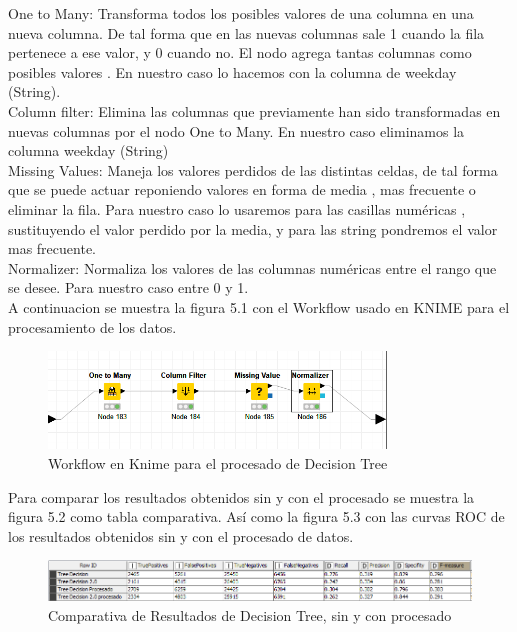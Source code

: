 	One to Many: Transforma todos los posibles valores de una columna en una nueva columna. De tal forma que en las nuevas columnas sale 1 cuando la fila pertenece a ese valor, y 0 cuando no. El nodo agrega tantas columnas como posibles valores . En nuestro caso lo hacemos con la columna de weekday (String). \\
	
	Column filter: Elimina las columnas que previamente han sido transformadas en nuevas columnas por el nodo One to Many. En nuestro caso eliminamos la columna weekday (String) \\
	
	Missing Values: Maneja los valores perdidos de las distintas celdas, de tal forma que se puede actuar reponiendo valores en forma de media , mas frecuente o eliminar la fila. Para nuestro caso lo usaremos para las casillas numéricas , sustituyendo el valor perdido por la media, y para las string pondremos el valor mas frecuente. \\
	
	Normalizer: Normaliza los valores de las columnas numéricas entre el rango que se desee. Para nuestro caso entre 0 y 1.\\
	
	A continuacion se muestra la figura 5.1 con el Workflow usado en KNIME para el procesamiento de los datos. 
	
	\begin{figure}[htb]
		\centering
		\includegraphics[width=0.8\textwidth]{./imagenes/58}
		\caption{Workflow en Knime para el procesado de Decision Tree} \label{fig:1}
	\end{figure}
	
	Para comparar los resultados obtenidos sin y con el procesado se muestra la figura 5.2 como tabla comparativa. Así como la figura 5.3 con las curvas ROC de los resultados obtenidos sin y con el procesado de datos.
	
	\begin{figure}[htb]
		\centering
		\includegraphics[width=1.0\textwidth]{./imagenes/59}
		\caption{Comparativa de Resultados de Decision Tree, sin y con procesado} \label{fig:1}
	\end{figure}
	
